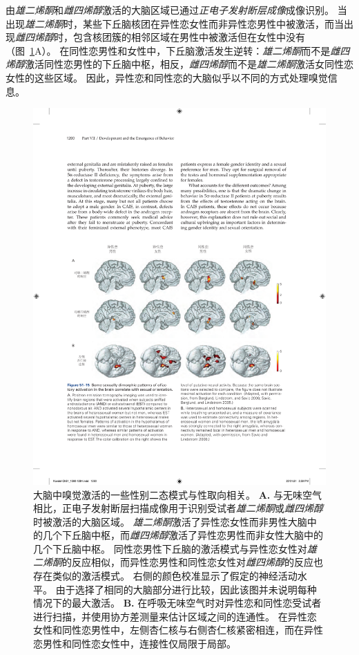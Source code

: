 由\textit{雄二烯酮}和\textit{雌四烯醇}激活的大脑区域已通过\textit{正电子发射断层成像}成像识别。
当出现\textit{雄二烯酮}时，某些下丘脑核团在异性恋女性而非异性恋男性中被激活，而当出现\textit{雌四烯醇}时，包含核团簇的相邻区域在男性中被激活但在女性中没有（图~\ref{fig:51_15}A）。
在同性恋男性和女性中，下丘脑激活发生逆转：\textit{雄二烯酮}而不是\textit{雌四烯醇}激活同性恋男性的下丘脑中枢，相反，\textit{雌四烯醇}而不是\textit{雄二烯酮}激活女同性恋女性的这些区域。
因此，异性恋和同性恋的大脑似乎以不同的方式处理嗅觉信息。


\begin{figure}[htbp]
	\centering
	\includegraphics[width=1.0\linewidth]{chap51/fig_51_15}
	\caption{大脑中嗅觉激活的一些性别二态模式与性取向相关。
		\textbf{A.} 与无味空气相比，正电子发射断层扫描成像用于识别受试者\textit{雄二烯酮}或\textit{雌四烯醇}时被激活的大脑区域。
		\textit{雄二烯酮}激活了异性恋女性而非男性大脑中的几个下丘脑中枢，而\textit{雌四烯醇}激活了异性恋男性而非女性大脑中的几个下丘脑中枢。
		同性恋男性下丘脑的激活模式与异性恋女性对\textit{雄二烯酮}的反应相似，而异性恋男性和同性恋女性对\textit{雌四烯醇}的反应也存在类似的激活模式。
		右侧的颜色校准显示了假定的神经活动水平。
		由于选择了相同的大脑部分进行比较，因此该图并未说明每种情况下的最大激活\cite{berglund2006brain}。
		\textbf{B.} 在呼吸无味空气时对异性恋和同性恋受试者进行扫描，并使用协方差测量来估计区域之间的连通性。
		在异性恋女性和同性恋男性中，左侧杏仁核与右侧杏仁核紧密相连，而在异性恋男性和同性恋女性中，连接性仅局限于局部\cite{savic2008pet}。}
	\label{fig:51_15}
\end{figure}


